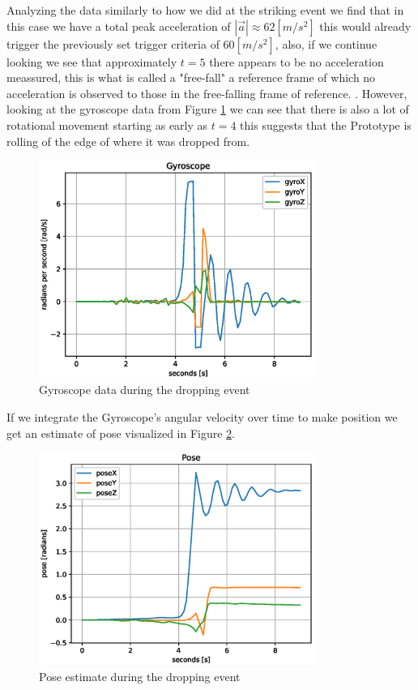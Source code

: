 \documentclass[../main.tex]{subfiles}
\begin{document}
Analyzing the data similarly to how we did at the striking event we find that in this case we have a total peak acceleration of $|\overrightarrow{a}| \approx 62 [m/s^2]$ this would already trigger the previously set trigger criteria of $60 [m/s^2]$, also, if we continue looking we see that approximately $t=5$ there appears to be no acceleration meassured, this is what is called a "free-fall" a reference frame of which no acceleration is observed to those in the free-falling frame of reference. \cite{Freefall_Encyclopædia_Britannica_2024}. However, looking at the gyroscope data from Figure \ref{fig:gyroscope_dropping} we can see that there is also a lot of rotational movement starting as early as $t=4$ this suggests that the Prototype is rolling of the edge of where it was dropped from.

\begin{figure}[htbp]
    \centering
    \includegraphics[width=0.8\textwidth]{resources/figures/Gyro_drop.eps}
    \caption{Gyroscope data during the dropping event}
    \label{fig:gyroscope_dropping}
\end{figure}

If we integrate the Gyroscope's angular velocity over time to make position we get an estimate of pose visualized in Figure \ref{fig:pose_dropping}.


\begin{figure}[htbp]
    \centering
    \includegraphics[width=0.8\textwidth]{resources/figures/Pose_drop.eps}
    \caption{Pose estimate during the dropping event}
    \label{fig:pose_dropping}
\end{figure}
\end{document}
